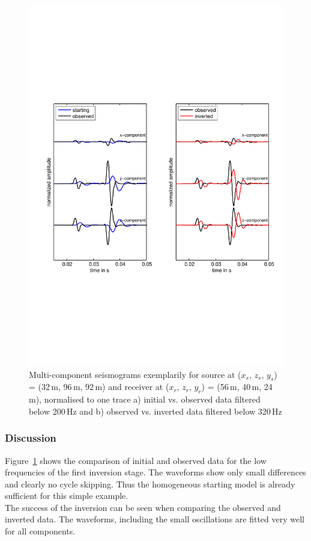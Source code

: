 \begin{figure}[h!]
\begin{center}
\includegraphics[width=\textwidth]{fig_toy/seismo_trace_toy}
\caption[Toy example - observed, initial and inverted seismograms]{Multi-component seismograms exemplarily for source at ($x_s$, $z_s$, $y_s$) = (32\,m, 96\,m, 92\,m) and receiver at ($x_r$, $z_r$, $y_r$) = (56\,m, 40\,m, 24\,m), normalised to one trace a) initial vs. observed data filtered below 200\,Hz and b) observed vs. inverted data filtered below 320\,Hz} \label{fig:toy_seismo1}
\end{center}
\end{figure}
\subsubsection*{Discussion}
Figure~\ref{fig:toy_seismo1} shows the comparison of initial and observed data for the low frequencies of the first inversion stage. The waveforms show only small differences and clearly no cycle skipping. Thus the homogeneous starting model is already sufficient for this simple example. \\
The success of the inversion can be seen when comparing the observed and inverted data. The waveforms, including the small oscillations are fitted very well for all components.
